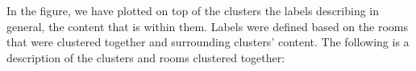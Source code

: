 






In the figure, we have plotted on top of the clusters the labels describing in general, the content that is within them. Labels were defined based on the rooms that were clustered together and surrounding clusters' content. The following is a description of the clusters and rooms clustered together:

